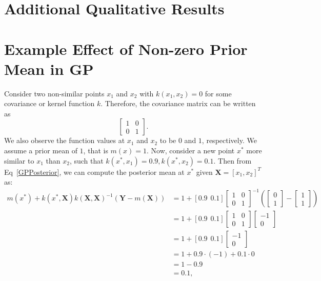 \chapter{Additional Qualitative Results}\label{ch:additional_qual}



\chapter{Example Effect of Non-zero Prior Mean in GP}\label{ch:nonzerogp}
Consider two non-similar points $x_1$ and $x_2$ with $k(x_1, x_2) = 0$ for some covariance or kernel function $k$. Therefore, the covariance matrix can be written as \[\left[\begin{array}{cc}
   1 & 0 \\
   0 & 1
\end{array}\right].\]We also observe the function values at $x_1$ and $x_2$ to be $0$ and $1$, respectively. We assume a prior mean of $1$, that is $m(x)=1$. Now, consider a new point $x^*$ more similar to $x_1$ than $x_2$, such that $k(x^*, x_1)=0.9, k(x^*, x_2)=0.1$. Then from Eq~\ref{GPPosterior}, we can compute the posterior mean at $x^*$ given $\mathbf{X}=[x_1, x_2]^T$ as:
{\small\begingroup
\renewcommand{\arraystretch}{1.25}
\setlength\arraycolsep{2.5pt}
\begin{align}
    m\left(x^*\right)+k\left(x^*, \mathbf{X}\right) k\left(\mathbf{X}, \mathbf{X}\right)^{-1}\left(\mathbf{Y}-m\left(\mathbf{X}\right)\right) & = 1 + [0.9 \hspace{5pt} 0.1] \left[\begin{array}{cc}
        1 & 0 \\
        0 & 1
    \end{array}\right]^{-1} \left(\left[\begin{array}{c}
        0\\
        1
        \end{array}\right] -
        \left[\begin{array}{c}
        1\\
        1
        \end{array}\right]
        \right)\\
        &= 1 + [0.9 \hspace{5pt} 0.1] \left[\begin{array}{cc}
        1 & 0 \\
        0 & 1
    \end{array}\right] \left[\begin{array}{c}
        -1\\
        0
        \end{array}\right]\\
        &= 1 + [0.9 \hspace{5pt} 0.1] \left[\begin{array}{c}
        -1\\
        0
        \end{array}\right]\\
        &= 1 + 0.9\cdot (-1) + 0.1 \cdot 0\\
        &= 1 -0.9\\
        &= 0.1,
\end{align}
\endgroup
}
